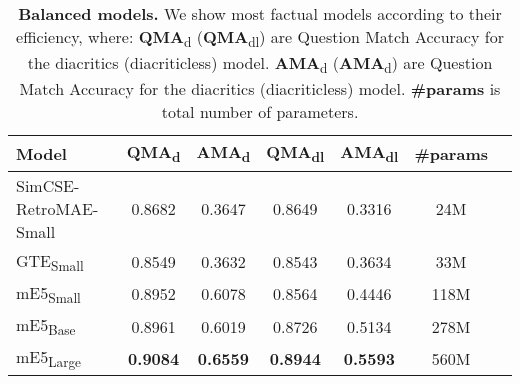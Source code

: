 \begin{table}[ht!]
  \centering
  \begin{tabular}{lcccccc}
    \toprule
    \textbf{Model} & \textbf{QMA}\textsubscript{d} & \textbf{AMA}\textsubscript{d} & \textbf{QMA}\textsubscript{dl} & \textbf{AMA}\textsubscript{dl} & \textbf{\#params} \\
    \midrule
    SimCSE-RetroMAE-Small & 0.8682 & 0.3647 & 0.8649 & 0.3316 & 24M \\
    GTE\textsubscript{Small} & 0.8549 & 0.3632 & 0.8543 & 0.3634 & 33M \\
    mE5\textsubscript{Small} & 0.8952 & 0.6078 & 0.8564 & 0.4446 & 118M \\
    mE5\textsubscript{Base} & 0.8961 & 0.6019 & 0.8726 & 0.5134 & 278M \\
    mE5\textsubscript{Large} & \textbf{0.9084} & \textbf{0.6559} & \textbf{0.8944} & \textbf{0.5593} & 560M \\
    \bottomrule
  \end{tabular}
  \caption{\textbf{Balanced models.}
    We show most factual models according to their efficiency, where:
    \textbf{QMA}\textsubscript{d} (\textbf{QMA}\textsubscript{dl}) are Question Match Accuracy for the diacritics (diacriticless) model.
    \textbf{AMA}\textsubscript{d} (\textbf{AMA}\textsubscript{d}) are Question Match Accuracy for the diacritics (diacriticless) model.
    \textbf{\#params} is total number of parameters.}
  \label{tab:balanced}
\end{table}
  